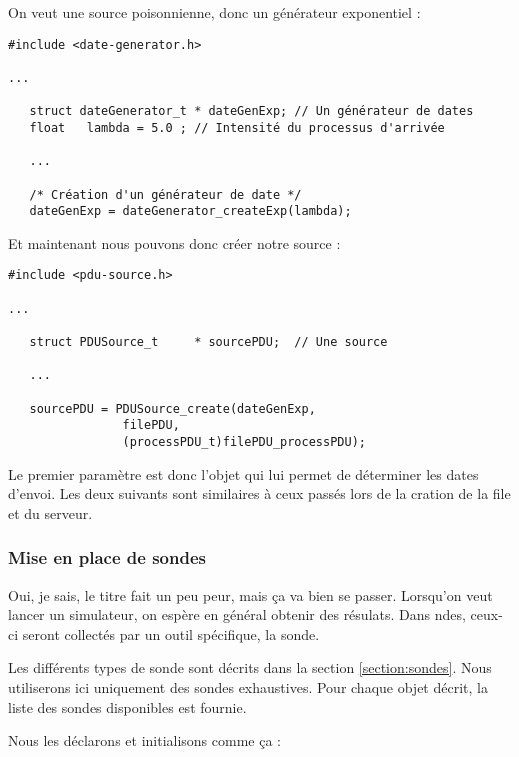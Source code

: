 \documentclass{article}
\begin{document}
   On veut une source poisonnienne, donc un générateur exponentiel :

\begin{verbatim}
#include <date-generator.h>

...

   struct dateGenerator_t * dateGenExp; // Un générateur de dates
   float   lambda = 5.0 ; // Intensité du processus d'arrivée

   ...

   /* Création d'un générateur de date */
   dateGenExp = dateGenerator_createExp(lambda);
\end{verbatim}

   Et maintenant nous pouvons donc créer notre source :

\begin{verbatim}
#include <pdu-source.h>

...

   struct PDUSource_t     * sourcePDU;  // Une source

   ...

   sourcePDU = PDUSource_create(dateGenExp, 
				filePDU,
				(processPDU_t)filePDU_processPDU);
\end{verbatim}

   Le premier paramètre est donc l'objet qui lui permet de déterminer
les dates d'envoi. Les deux suivants sont similaires à ceux passés
lors de la cration de la file et du serveur.
   
%
\subsubsection{Mise en place de sondes}

   Oui, je sais, le titre fait un peu peur, mais ça va bien se
passer. Lorsqu'on veut lancer un simulateur, on espère en général
obtenir des résulats. Dans {\sc ndes}, ceux-ci seront collectés par un
outil spécifique, la sonde.

   Les différents types de sonde sont décrits dans la section
\ref{section:sondes}. Nous utiliserons ici uniquement des sondes
exhaustives. Pour chaque objet décrit, la liste des sondes
disponibles est fournie. 

   Nous les déclarons et initialisons comme ça :
\end{document}

